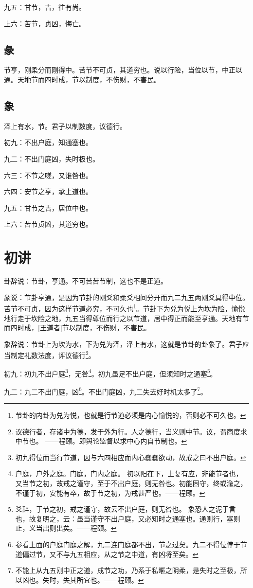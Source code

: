 \documentclass[12pt,oneside]{book}
\begin{document}
九五：甘节，吉，往有尚。

上六：苦节，贞凶，悔亡。


\subsection{彖}
节亨，刚柔分而刚得中。苦节不可贞，其道穷也。说以行险，当位以节，中正以通。天地节而四时成，节以制度，不伤财，不害民。

\subsection{象}
泽上有水，节。君子以制数度，议德行。

初九：不出户庭，知通塞也。

九二：不出门庭凶，失时极也。

六三：不节之嗟，又谁咎也。

六四：安节之亨，承上道也。

九五：甘节之吉，居位中也。

上六：苦节贞凶，其道穷也。


\section{初讲}
卦辞说：节卦，亨通。不可苦苦节制，这也不是正道。

彖说：节卦亨通，是因为节卦的刚爻和柔爻相间分开而九二九五两刚爻具得中位。苦节不可贞，因为这样节道必穷，不可久也\footnote{节卦的内卦为兑为悦，也就是行节道必须是内心愉悦的，否则必不可久也。}。节卦下为兑为悦上为坎为险，愉悦地行走于坎险之地，九五当得尊位而行之以节道，居中得正而能至亨通。天地有节而四时成，[王道者]节以制度，不伤财，不害民。

象辞说：节卦上为坎为水，下为兑为泽，泽上有水，这就是节卦的卦象了。君子应当制定礼数法度，评议德行\footnote{议德行者，存诸中为德，发于外为行。人之德行，当义则中节。议，谓商度求中节也。 ——程颐。即舆论监督以求中心内自节制也。}。


初九：初九不出户庭\footnote{初九得位而当行节道，因与六四相应而内心蠢蠢欲动，故戒之曰不出户庭。}，无咎\footnote{户庭，户外之庭。门庭，门内之庭。 初以阳在下，上复有应，非能节者也，又当节之初，故戒之谨守，至于不出户庭，则无咎也。初能固守，终或渝之，不谨于初，安能有卒，故于节之初，为戒甚严也。——程颐。}。初九虽足不出户庭，但须知时之通塞\footnote{爻辞，于节之初，戒之谨守，故云不出户庭，则无咎也。 象恐人之泥于言也，故复明之，云：虽当谨守不出户庭，又必知时之通塞也。通则行，塞则止，义当出则出矣。——程颐。}。

九二：九二不出门庭，凶\footnote{参看上面的户庭门庭之解，九二连门庭都不出，节之过矣。九二不得位悖于节道偏过节，又不与九五相应，从之节之中道，有凶将至矣。}。不出门庭凶，九二失去好时机太多了\footnote{不能上从九五刚中正之道，成节之功，乃系于私暱之阴柔，是失时之至极，所以凶也。失时，失其所宜也。——程颐。}。
\end{document}
